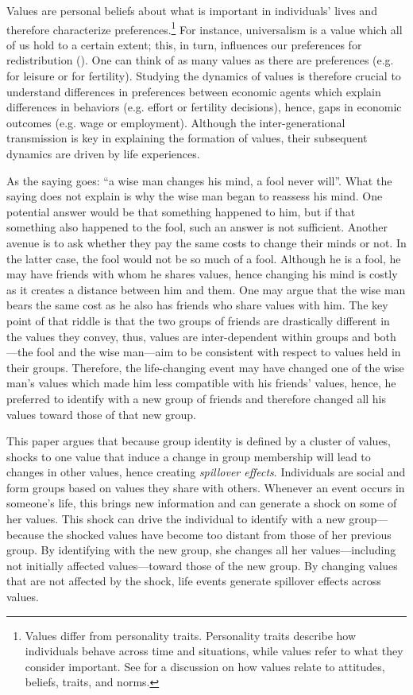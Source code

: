 Values are personal beliefs about what is important in individuals' lives and therefore characterize preferences.\footnote{Values differ from personality traits. Personality traits describe how individuals behave across time and situations, while values refer to what they consider important. See \citet{Schwartz2012Overview} for a discussion on how values relate to attitudes, beliefs, traits, and norms.}
For instance, universalism is a value which all of us hold to a certain extent; this, in turn, influences our preferences for redistribution (\citealt{Enke2020Moral}).
One can think of as many values as there are preferences (e.g. for leisure or for fertility).
Studying the dynamics of values is therefore crucial to understand differences in preferences between economic agents which explain differences in behaviors (e.g. effort or fertility decisions), hence, gaps in economic outcomes (e.g. wage or employment).
Although the inter-generational transmission is key in explaining the formation of values, their subsequent dynamics are driven by life experiences.

As the saying goes: ``a wise man changes his mind, a fool never will''. What the saying does not explain is why the wise man began to reassess his mind. One potential answer would be that something happened to him, but if that something also happened to the fool, such an answer is not sufficient. 
Another avenue is to ask whether they pay the same costs to change their minds or not. In the latter case, the fool would not be so much of a fool. Although he is a fool, he may have friends with whom he shares values, hence changing his mind is costly as it creates a distance between him and them. One may argue that the wise man bears the same cost as he also has friends who share values with him. 
The key point of that riddle is that the two groups of friends are drastically different in the values they convey, thus, values are inter-dependent within groups and both---the fool and the wise man---aim to be consistent with respect to values held in their groups. Therefore, the life-changing event may have changed one of the wise man's values which made him less compatible with his friends' values, hence, he preferred to identify with a new group of friends and therefore changed all his values toward those of that new group.

This paper argues that because group identity is defined by a cluster of values, shocks to one value that induce a change in group membership will lead to changes in other values, hence creating \textit{spillover effects}. Individuals are social and form groups based on values they share with others. Whenever an event occurs in someone's life, this brings new information and can generate a shock on some of her values. This shock can drive the individual to identify with a new group---because the shocked values have become too distant from those of her previous group. By identifying with the new group, she changes all her values---including not initially affected values---toward those of the new group. By changing values that are not affected by the shock, life events generate spillover effects across values.

